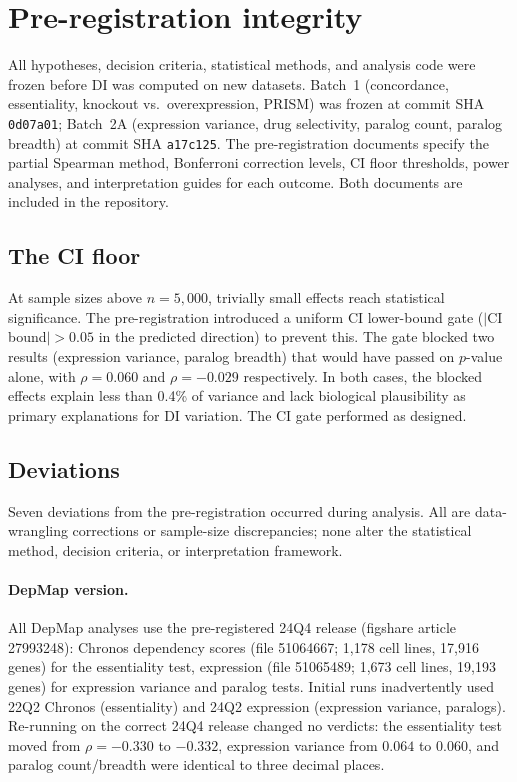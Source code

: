 \documentclass[11pt]{article}
\begin{document}
\section{Pre-registration integrity}
\label{sec:integrity}

All hypotheses, decision criteria, statistical methods, and analysis
code were frozen before DI was computed on new datasets.  Batch~1
(concordance, essentiality, knockout vs.\ overexpression, PRISM) was
frozen at commit SHA \texttt{0d07a01}; Batch~2A (expression variance,
drug selectivity, paralog count, paralog breadth) at commit SHA
\texttt{a17c125}.  The pre-registration documents specify the
partial Spearman method, Bonferroni correction levels, CI floor
thresholds, power analyses, and interpretation guides for each outcome.
Both documents are included in the repository.

\subsection{The CI floor}

At sample sizes above $n = 5{,}000$, trivially small effects reach
statistical significance.  The pre-registration introduced a uniform
CI lower-bound gate ($|$CI bound$| > 0.05$ in the predicted direction)
to prevent this.  The gate blocked two results (expression variance, paralog breadth) that
would have passed on $p$-value alone, with $\rho = 0.060$ and
$\rho = -0.029$
respectively.  In both cases, the blocked effects explain less than
0.4\% of variance and lack biological plausibility as primary
explanations for DI variation.  The CI gate performed as designed.

\subsection{Deviations}

Seven deviations from the pre-registration occurred during analysis.
All are data-wrangling corrections or sample-size discrepancies; none
alter the statistical method, decision criteria, or interpretation
framework.

\paragraph{DepMap version.}
All DepMap analyses use the pre-registered 24Q4 release (figshare
article 27993248): Chronos dependency scores (file 51064667; 1{,}178
cell lines, 17{,}916 genes) for the essentiality test, expression
(file 51065489; 1{,}673 cell lines, 19{,}193 genes) for expression
variance and paralog tests.
Initial runs inadvertently used 22Q2 Chronos (essentiality) and 24Q2
expression (expression variance, paralogs).  Re-running on the correct 24Q4 release changed no
verdicts: the essentiality test moved from $\rho = -0.330$ to $-0.332$,
expression variance from $0.064$ to $0.060$, and paralog count/breadth
were identical to three decimal places.
\end{document}
